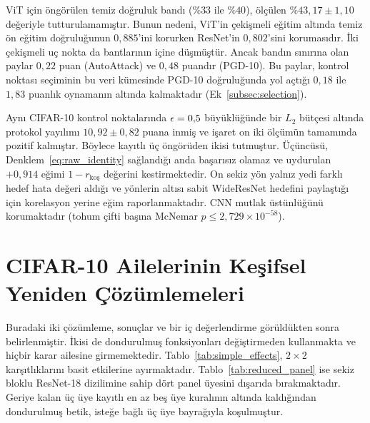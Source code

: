 ViT için öngörülen temiz doğruluk bandı ($\%33$ ile $\%40$), ölçülen $\%43{,}17\pm1{,}10$ değeriyle tutturulamamıştır. Bunun nedeni, ViT'in çekişmeli eğitim altında temiz ön eğitim doğruluğunun $0{,}885$'ini korurken ResNet'in $0{,}802$'sini korumasıdır. İki çekişmeli uç nokta da bantlarının içine düşmüştür. Ancak bandın sınırına olan paylar $0{,}22$ puan (AutoAttack) ve $0{,}48$ puandır (PGD-10). Bu paylar, kontrol noktası seçiminin bu veri kümesinde PGD-10 doğruluğunda yol açtığı $0{,}18$ ile $1{,}83$ puanlık oynamanın altında kalmaktadır (Ek~\ref{subsec:selection}).

Aynı CIFAR-10 kontrol noktalarında $\epsilon = 0{,}5$ büyüklüğünde bir $L_2$ bütçesi altında protokol yayılımı $10{,}92\pm0{,}82$ puana inmiş ve işaret on iki ölçümün tamamında pozitif kalmıştır. Böylece kayıtlı üç öngörüden ikisi tutmuştur. Üçüncüsü, Denklem~\eqref{eq:raw_identity} sağlandığı anda başarısız olamaz ve uydurulan $+0{,}914$ eğimi $1 - r_{\text{koş}}$ değerini kestirmektedir. On sekiz yön yalnız yedi farklı hedef hata değeri aldığı ve yönlerin altısı sabit WideResNet hedefini paylaştığı için korelasyon yerine eğim raporlanmaktadır. CNN mutlak üstünlüğünü korumaktadır (tohum çifti başına McNemar $p \leq 2{,}729\times10^{-58}$).

\section{CIFAR-10 Ailelerinin Keşifsel Yeniden Çözümlemeleri}
\label{app:exploratory}

Buradaki iki çözümleme, sonuçlar ve bir iç değerlendirme görüldükten sonra belirlenmiştir. İkisi de dondurulmuş fonksiyonları değiştirmeden kullanmakta ve hiçbir karar ailesine girmemektedir. Tablo~\ref{tab:simple_effects}, $2\times2$ karşıtlıklarını basit etkilerine ayırmaktadır. Tablo~\ref{tab:reduced_panel} ise sekiz bloklu ResNet-18 dizilimine sahip dört panel üyesini dışarıda bırakmaktadır. Geriye kalan üç üye kayıtlı en az beş üye kuralının altında kaldığından dondurulmuş betik, isteğe bağlı üç üye bayrağıyla koşulmuştur.

